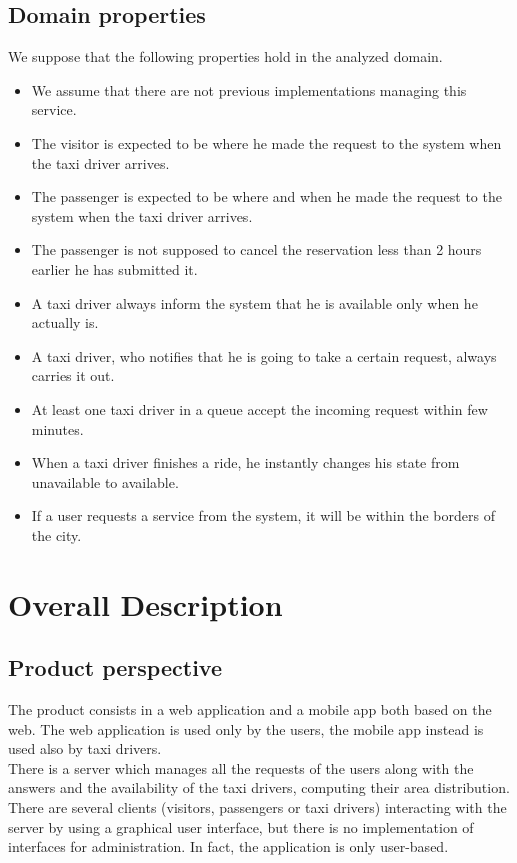 \documentclass[18pt,oneside,a4paper, titlepage]{article}
\begin{document}
	\subsection{Domain properties}
	We suppose that the following properties hold in the analyzed domain.
	\begin{itemize}
		\item We assume that there are not previous implementations managing this service.
		\item The visitor is expected to be where he made the request to the system when the taxi driver arrives.
		\item The passenger is expected to be where and when he made the request to the system when the taxi driver arrives.
		\item The passenger is not supposed to cancel the reservation less than 2 hours earlier he has submitted it.
		\item A taxi driver always inform the system that he is available only when he actually is.
		\item A taxi driver, who notifies that he is going to take a certain request, always carries it out.
		\item At least one taxi driver in a queue accept the incoming request within few minutes.
		\item When a taxi driver finishes a ride, he instantly changes his state from unavailable to available.
		\item If a user requests a service from the system, it will be within the borders of the city.
		
	\end{itemize}


\newpage
\section{Overall Description}
	\subsection{Product perspective}
	The product consists in a web application and a mobile app both based on the web. The web application is used only by the users, the mobile app instead is used also by taxi drivers.\\
	There is a server which manages all the requests of the users along with the answers and the availability of the taxi drivers, computing their area distribution. There are several clients (visitors, passengers or taxi drivers) interacting with the server by using a graphical user interface, but there is no implementation of interfaces for administration. In fact, the application is only user-based.
	
\end{document}
